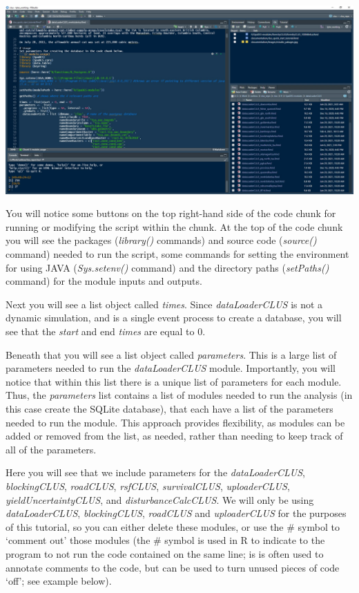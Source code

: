 \documentclass[
]{article}
\begin{document}
\includegraphics{images/dataloader1.jpg}

You will notice some buttons on the top right-hand side of the code
chunk for running or modifying the script within the chunk. At the top
of the code chunk you will see the packages (\emph{library()} commands)
and source code (\emph{source()} command) needed to run the script, some
commands for setting the environment for using JAVA (\emph{Sys.setenv()}
command) and the directory paths (\emph{setPaths()} command) for the
module inputs and outputs.

Next you will see a list object called \emph{times}. Since
\emph{dataLoaderCLUS} is not a dynamic simulation, and is a single event
process to create a database, you will see that the \emph{start} and end
\emph{times} are equal to 0.

Beneath that you will see a list object called \emph{parameters}. This
is a large list of parameters needed to run the \emph{dataLoaderCLUS}
module. Importantly, you will notice that within this list there is a
unique list of parameters for each module. Thus, the \emph{parameters}
list contains a list of modules needed to run the analysis (in this case
create the SQLite database), that each have a list of the parameters
needed to run the module. This approach provides flexibility, as modules
can be added or removed from the list, as needed, rather than needing to
keep track of all of the parameters.

Here you will see that we include parameters for the
\emph{dataLoaderCLUS}, \emph{blockingCLUS}, \emph{roadCLUS},
\emph{rsfCLUS}, \emph{survivalCLUS}, \emph{uploaderCLUS},
\emph{yieldUncertaintyCLUS}, and \emph{disturbanceCalcCLUS}. We will
only be using \emph{dataLoaderCLUS}, \emph{blockingCLUS},
\emph{roadCLUS} and \emph{uploaderCLUS} for the purposes of this
tutorial, so you can either delete these modules, or use the \# symbol
to `comment out' those modules (the \# symbol is used in R to indicate
to the program to not run the code contained on the same line; is is
often used to annotate comments to the code, but can be used to turn
unused pieces of code `off'; see example below).
\end{document}
